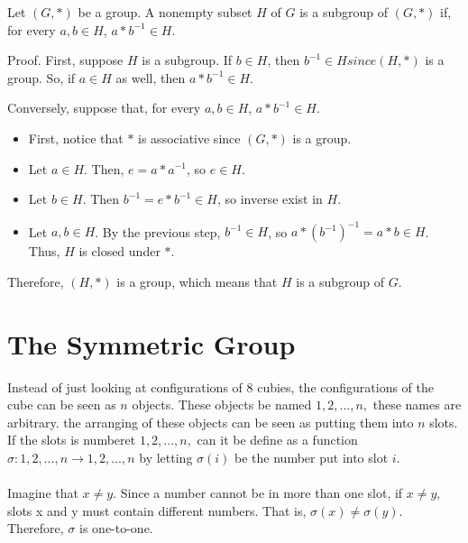 Let $(G,*)$ be a group. A nonempty subset $H$ of $G$ is a subgroup of $(G,*)$ if, for every $a, b \in H$, $a * b^{-1} \in H$.

Proof. First, suppose $H$ is a subgroup. If $b \in H$, then $b^{-1} \in H since (H,*)$ is a group. So, if $a \in H$ as well, then $a * b^{-1} \in H$.

Conversely, suppose that, for every $a, b \in H$, $a * b^{-1} \in H$.

\begin {itemize}
\item First, notice that $*$ is associative since $(G,*)$ is a group.
\item Let $a \in H$. Then, $e = a * a^{-1}$, so $e \in H$.
\item Let $b \in H$. Then $b^{-1} = e * b^{-1} \in H$, so inverse exist in $H$.
\item Let $a, b \in H$. By the previous step, $b^{-1} \in H$, so $a* (b^{-1})^{-1} = a* b \in H$. Thus, $H$ is closed under $*$.
\end {itemize}

Therefore, $(H,*)$ is a group, which means that $H$ is a subgroup of $G$.

\section{The Symmetric Group}

Instead of just looking at configurations of 8 cubies, the configurations of the cube can be seen as $n$ objects. 
These objects be named $1, 2, . . . , n,$ these names are arbitrary. the arranging of these objects can be seen as
putting them into $n$ slots. If the slots is numberet $1, 2, . . . , n,$ can it be define as a function $\sigma : {1, 2, . . . , n} \rightarrow
{1, 2, . . . , n}$ by letting $\sigma(i)$ be the number put into slot $i$.

\paragraph{}
Imagine that $x\neq y$. Since a number cannot be in more than one slot, if $x \neq y$, slots x and y must contain
different numbers. That is, $\sigma(x) \neq \sigma(y)$. Therefore, $\sigma$ is one-to-one.
